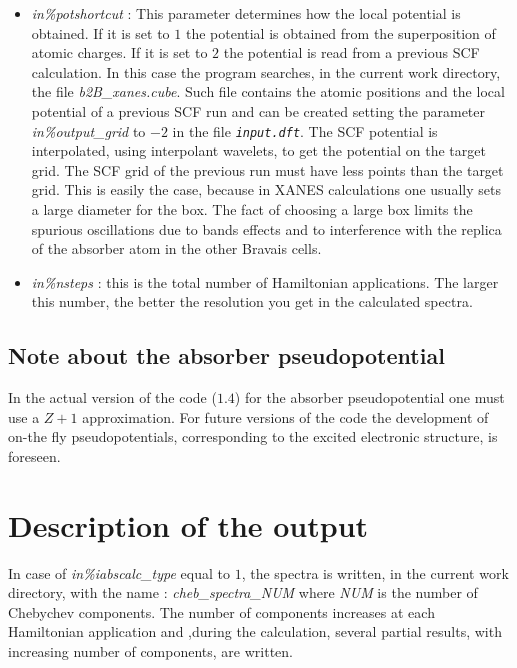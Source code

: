 \documentclass[a4paper,11pt]{report}
\begin{document}
\begin{itemize}
\item   {\it in\%potshortcut } : This parameter determines how the 
local potential is obtained. If it is set to $1$ the potential is
obtained from the superposition of atomic charges.
If it is set to $2$ the potential is read from a previous SCF
calculation. In this case the program searches, in the current work directory,
the file {\it b2B\_xanes.cube}. Such file contains the atomic positions
and the local potential of a previous SCF run and can be created
setting the parameter {\it in\%output\_grid} to $-2$ in
the file {\it \texttt{input.dft}}. The SCF potential is interpolated, using
interpolant wavelets, to get the potential on the target grid.
The SCF grid of the previous run must have less points than the target
grid.
This is easily the case, because in XANES calculations one usually
sets a large diameter for the box. The fact of choosing a large box 
limits the spurious oscillations due to bands effects and to interference with the replica
of the absorber atom in the other Bravais cells. 

\item {\it in\%nsteps } : this is the total number of Hamiltonian
  applications. The larger this number, the better the resolution you get
  in the calculated spectra.

\end{itemize}


\subsection{Note about the absorber pseudopotential}
 In the actual version of the code ($1.4$) for the absorber
pseudopotential one must use a $Z+1$ approximation.
For future versions of the code the development of on-the fly
pseudopotentials, corresponding to the excited electronic structure,
is foreseen.


\section{Description of the output}

In case of  {\it in\%iabscalc\_type} equal to  $1$, the spectra
is written, in the current work directory, with the name :
{\it  cheb\_spectra\_NUM  } where {\it NUM} is the number of 
Chebychev components. The number of components increases
at each Hamiltonian application and ,during the calculation,
 several partial results, with increasing number of components,
 are written.
\end{document}
